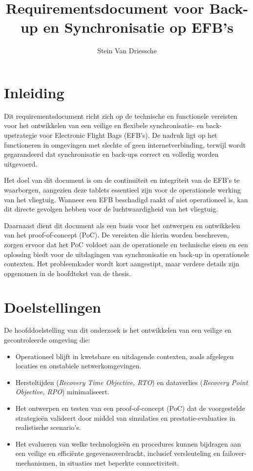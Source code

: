 \documentclass{hogent-article}
\title{Requirementsdocument voor Back-up en Synchronisatie op EFB's}
\author{Stein Van Driessche}
\begin{document}
    
    \maketitle
    
    \section{Inleiding}
    Dit requirementsdocument richt zich op de technische en functionele vereisten voor het ontwikkelen van een veilige en flexibele synchronisatie- en back-upstrategie voor Electronic Flight Bags (EFB's). De nadruk ligt op het functioneren in omgevingen met slechte of geen internetverbinding, terwijl wordt gegarandeerd dat synchronisatie en back-ups correct en volledig worden uitgevoerd.
    
    Het doel van dit document is om de continuïteit en integriteit van de EFB's te waarborgen, aangezien deze tablets essentieel zijn voor de operationele werking van het vliegtuig. Wanneer een EFB beschadigd raakt of niet operationeel is, kan dit directe gevolgen hebben voor de luchtwaardigheid van het vliegtuig.
    
    Daarnaast dient dit document als een basis voor het ontwerpen en ontwikkelen van het proof-of-concept (PoC). De vereisten die hierin worden beschreven, zorgen ervoor dat het PoC voldoet aan de operationele en technische eisen en een oplossing biedt voor de uitdagingen van synchronisatie en back-up in operationele contexten. Het probleemkader wordt kort aangestipt, maar verdere details zijn opgenomen in de hoofdtekst van de thesis.
    
    \section{Doelstellingen}
    De hoofddoelstelling van dit onderzoek is het ontwikkelen van een veilige en gecontroleerde omgeving die:
    \begin{itemize}
        \item Operationeel blijft in kwetsbare en uitdagende contexten, zoals afgelegen locaties en onstabiele netwerkomgevingen.
        \item Hersteltijden (\textit{Recovery Time Objective, RTO}) en dataverlies (\textit{Recovery Point Objective, RPO}) minimaliseert.
        \item Het ontwerpen en testen van een proof-of-concept (PoC) dat de voorgestelde strategieën valideert door middel van simulaties en prestatie-evaluaties in realistische scenario’s.
        \item Het evalueren van welke technologieën en procedures kunnen bijdragen aan een veilige en efficiënte gegevensoverdracht, inclusief versleuteling en failover-mechanismen, in situaties met beperkte connectiviteit.
    \end{itemize}
    
\end{document}
